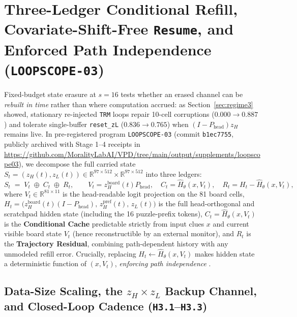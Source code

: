 \documentclass[10pt,letterpaper]{article}
\newcommand{\Phead}{P_{\mathrm{head}}}
\begin{document}
\section{Three-Ledger Conditional Refill, Covariate-Shift-Free \texttt{Resume}, and Enforced Path Independence (\texttt{LOOPSCOPE-03})}\label{sec:loopscope03}

Fixed-budget state erasure at $s=16$ tests whether an erased channel can be \emph{rebuilt in time} rather than where computation accrued: as Section~\ref{sec:regime3} showed, stationary re-injected \texttt{TRM} loops repair 10-cell corruptions ($0.000 \to 0.887$) and tolerate single-buffer \texttt{reset\_zL} ($0.836 \to 0.765$) when $(I-\Phead)z_H$ remains live. In pre-registered program \texttt{LOOPSCOPE-03} (commit \texttt{b1ec7755}, publicly archived with Stage 1--4 receipts in \url{https://github.com/MoralityLabAI/VPD/tree/main/output/supplements/loopscope03}), we decompose the full carried state $S_t = (z_H(t), z_L(t)) \in \mathbb{R}^{97\times 512} \times \mathbb{R}^{97\times 512}$ into three ledgers:
\begin{equation}
  S_t \;=\; V_t \;\oplus\; C_t \;\oplus\; R_t,
  \qquad
  V_t = z_H^{\mathrm{board}}(t)\Phead,\quad
  C_t = \hat{H}_\theta(x, V_t),\quad
  R_t = H_t - \hat{H}_\theta(x, V_t),
  \label{eq:three_ledgers}
\end{equation}
where $V_t \in \mathbb{R}^{81\times 11}$ is the head-readable logit projection on the 81 board cells, $H_t = \bigl(z_H^{\mathrm{board}}(t)(I-\Phead),\allowbreak\, z_H^{\mathrm{pref}}(t),\allowbreak\, z_L(t)\bigr)$ is the full head-orthogonal and scratchpad hidden state (including the 16 puzzle-prefix tokens), $C_t = \hat{H}_\theta(x, V_t)$ is the \textbf{Conditional Cache} predictable strictly from input clues $x$ and current visible board state $V_t$ (hence reconstructible by an external monitor), and $R_t$ is the \textbf{Trajectory Residual}, combining path-dependent history with any unmodeled refill error. Crucially, replacing $H_t \leftarrow \hat{H}_\theta(x, V_t)$ makes hidden state a deterministic function of $(x, V_t)$, \emph{enforcing path independence} \cite{anil2022path}.

\subsection{Data-Size Scaling, the \texorpdfstring{$z_H \times z_L$}{z\_H x z\_L} Backup Channel, and Closed-Loop Cadence (\texttt{H3.1}--\texttt{H3.3})}
\end{document}
